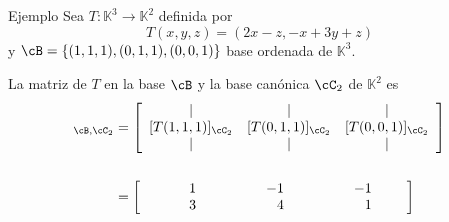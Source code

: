 \documentclass[handout]{beamer} %
\newcommand{\K}{\mathbb K}
\begin{document}
	
	
	\begin{frame}
	
	
	\begin{exampleblock}{Ejemplo}
	Sea $T:\K^3\longrightarrow\K^2$ definida por 
	$$T(x,y,z)=(2x-z,-x+3y+z)$$
	y $\cB=\{(1,1,1),(0,1,1),(0,0,1)\}$ base ordenada de $\K^3$.
	
	La matriz de $T$ en la base $\cB$ y la base canónica $\cC_2$ de $\K^2$ es
	\begin{align*}
	[T]_{\cB,\cC_2}
	&=\left[
	\begin{array}{ccc}
	\mid& \mid& \mid\\
	$[$T(1,1,1)$]$_{\cC_2}&$[$T(0,1,1)$]$_{\cC_2}&$[$T(0,0,1)$]$_{\cC_2}\\
	\mid& \mid& \mid
	\end{array}
	\right]\\
	\\
	&=\left[
		 \begin{array}{rrr}
	\quad\quad\quad1&\quad\quad\quad\quad-1&\quad\quad\quad\quad-1\quad\quad\\3&4&1\quad\quad
	\end{array}
	\right] 
	\end{align*}
	\end{exampleblock}
	
	
	\end{frame}


	
\end{document}
